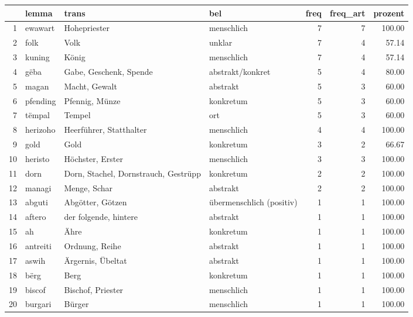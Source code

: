 \begin{tabular}{rlllrrr}
  \hline
 & lemma & trans & bel & freq & freq\_art & prozent \\ 
  \hline
1 & ewawart & Hohepriester & menschlich &   7 &   7 & 100.00 \\ 
  2 & folk & Volk & unklar &   7 &   4 & 57.14 \\ 
  3 & kuning & König & menschlich &   7 &   4 & 57.14 \\ 
  4 & gëba & Gabe, Geschenk, Spende & abstrakt/konkret &   5 &   4 & 80.00 \\ 
  5 & magan & Macht, Gewalt & abstrakt &   5 &   3 & 60.00 \\ 
  6 & pfending & Pfennig, Münze & konkretum &   5 &   3 & 60.00 \\ 
  7 & tëmpal & Tempel & ort &   5 &   3 & 60.00 \\ 
  8 & herizoho & Heerführer, Statthalter & menschlich &   4 &   4 & 100.00 \\ 
  9 & gold & Gold & konkretum &   3 &   2 & 66.67 \\ 
  10 & heristo & Höchster, Erster & menschlich &   3 &   3 & 100.00 \\ 
  11 & dorn & Dorn, Stachel, Dornstrauch, Gestrüpp & konkretum &   2 &   2 & 100.00 \\ 
  12 & managi & Menge, Schar & abstrakt &   2 &   2 & 100.00 \\ 
  13 & abguti & Abgötter, Götzen & übermenschlich (positiv) &   1 &   1 & 100.00 \\ 
  14 & aftero & der folgende, hintere & abstrakt &   1 &   1 & 100.00 \\ 
  15 & ah & Ähre & konkretum &   1 &   1 & 100.00 \\ 
  16 & antreiti & Ordnung, Reihe & abstrakt &   1 &   1 & 100.00 \\ 
  17 & aswih & Ärgernis, Übeltat & abstrakt &   1 &   1 & 100.00 \\ 
  18 & bërg & Berg & konkretum &   1 &   1 & 100.00 \\ 
  19 & biscof & Bischof, Priester & menschlich &   1 &   1 & 100.00 \\ 
  20 & burgari & Bürger & menschlich &   1 &   1 & 100.00 \\ 
   \hline
\end{tabular}
